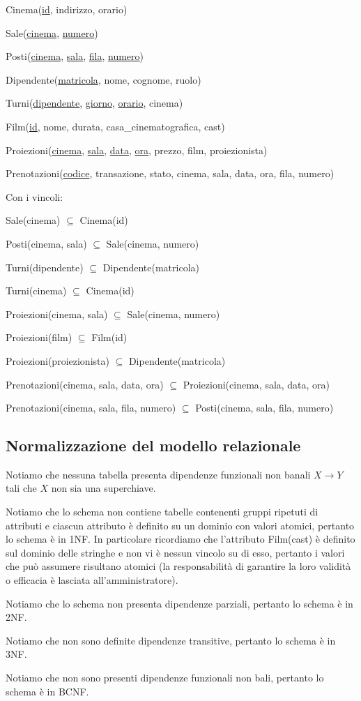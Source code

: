 Cinema(\underline{id}, indirizzo, orario)

Sale(\underline{cinema}, \underline{numero})

Posti(\underline{cinema},
\underline{sala},
\underline{fila},
\underline{numero})

Dipendente(\underline{matricola}, nome, cognome, ruolo)

Turni(\underline{dipendente}, \underline{giorno}, \underline{orario}, cinema)

Film(\underline{id}, nome, durata, casa\_cinematografica, cast)

Proiezioni(\underline{cinema},
\underline{sala},
\underline{data},
\underline{ora},
prezzo,
film,
proiezionista)

Prenotazioni(\underline{codice},
transazione,
stato,
cinema,
sala,
data,
ora,
fila,
numero)

\quad Con i vincoli:

Sale(cinema) $\subseteq$ Cinema(id)

Posti(cinema, sala) $\subseteq$ Sale(cinema, numero)

Turni(dipendente) $\subseteq$ Dipendente(matricola)

Turni(cinema) $\subseteq$ Cinema(id)

Proiezioni(cinema, sala) $\subseteq$ Sale(cinema, numero)

Proiezioni(film) $\subseteq$ Film(id)

Proiezioni(proiezionista) $\subseteq$ Dipendente(matricola)

Prenotazioni(cinema, sala, data, ora)
$\subseteq$
Proiezioni(cinema, sala, data, ora)

Prenotazioni(cinema, sala, fila, numero)
$\subseteq$
Posti(cinema, sala, fila, numero)

\subsection*{Normalizzazione del modello relazionale}
%
%

Notiamo che nessuna tabella presenta dipendenze funzionali non banali
$X \rightarrow Y$ tali che $X$ non sia una superchiave.

Notiamo che lo schema non contiene tabelle contenenti gruppi ripetuti di
attributi e ciascun attributo è definito su un dominio con valori atomici,
pertanto lo schema è in 1NF.
In particolare ricordiamo che l'attributo Film(cast) è definito
sul dominio delle stringhe e non vi è nessun vincolo su di esso, pertanto
i valori che può assumere risultano atomici (la responsabilità di garantire
la loro validità o efficacia è lasciata all'amministratore).

Notiamo che lo schema non presenta dipendenze parziali, pertanto lo schema è in
2NF.

Notiamo che non sono definite dipendenze transitive, pertanto lo schema è in
3NF.

Notiamo che non sono presenti dipendenze funzionali non bali, pertanto lo
schema è in BCNF.
